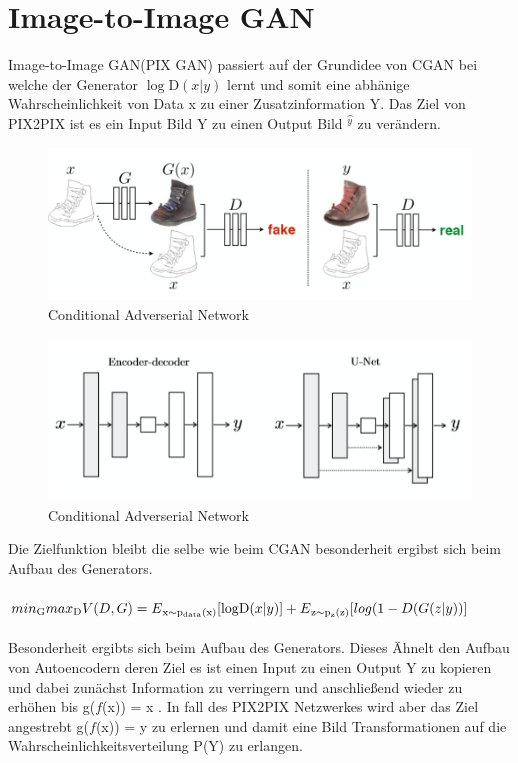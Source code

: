 \documentclass{llncs}
\begin{document}
\section{Image-to-Image GAN}
Image-to-Image GAN(PIX GAN) passiert auf der Grundidee von CGAN bei welche der Generator $\log $D$(x|y)$ lernt und somit eine abhänige Wahrscheinlichkeit von Data x zu einer Zusatzinformation Y. Das Ziel von PIX2PIX ist es ein Input Bild Y zu einen Output Bild $\hat{^y}$ zu verändern. 
\begin{figure}[htbp] 
	\centering
	\includegraphics[width=1.2\textwidth]{pix2pix.png}
	\caption{Conditional Adverserial Network}
	\label{fig:Bild2}
\end{figure}


\begin{figure}[htbp] 
	\centering
	\includegraphics[width=1.2\textwidth]{encoder.png}
	\caption{Conditional Adverserial Network}
	\label{fig:Bild2}
\end{figure}
Die Zielfunktion bleibt die selbe wie beim CGAN besonderheit ergibst sich beim Aufbau des Generators. 
\\\\
\begin{math}
min\textsubscript{G} max\textsubscript{D}V(D,G)=E\textsubscript{x$\sim$p\textsubscript{data}(x)}[\log $D$(x|y)]  + E\textsubscript{z$\sim$p\textsubscript{z}(z)}[log(1-D(G(z|y))]           
\end{math}
\\\\  
Besonderheit ergibts sich beim Aufbau des Generators. Dieses Ähnelt den Aufbau von Autoencodern deren Ziel es ist einen Input zu einen Output Y zu kopieren und dabei zunächst Information zu verringern und anschließend wieder zu erhöhen bis g($f$(x)) = x \cite{Grundlagen}. In fall des PIX2PIX Netzwerkes wird aber das Ziel angestrebt  g($f$(x)) = y zu erlernen und damit eine Bild Transformationen auf die Wahrscheinlichkeitsverteilung P(Y) zu erlangen. 
\cite{imagetoimage}
\end{document}
